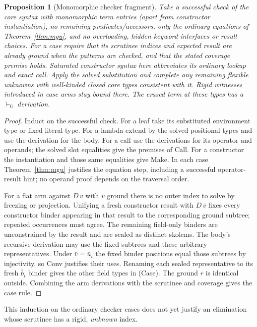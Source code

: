 \documentclass[11pt]{article}
\newtheorem{proposition}[theorem]{Proposition}
\theoremstyle{definition}
\begin{document}
\begin{proposition}[Monomorphic checker fragment]\label{prop:mono}
Take a successful check of the core syntax with monomorphic term entries (apart from
constructor instantiation), no remaining predicates/accessors, only the
ordinary equations of Theorem~\ref{thm:mgu}, and no overloading, hidden
keyword interfaces or result choices. For a case require that its
scrutinee indices and expected result are already ground when the patterns
are checked, and that the stated coverage premise holds. Saturated
constructor syntax here abbreviates its ordinary lookup and exact call.
Apply the solved substitution and complete any remaining flexible unknowns
with well-kinded closed core types consistent with it. Rigid witnesses
introduced in case arms stay bound there. The erased term at these types
has a $\vdash_0$ derivation.
\end{proposition}
\begin{proof}
Induct on the successful check. For a leaf take its substituted environment type or fixed literal
type. For a lambda extend by the solved positional types and use the
derivation for the body. For a call use the derivations for its operator
and operands; the solved slot equalities give the premises of \textsf{Call}.
For a constructor the instantiation and those same equalities give
\textsf{Make}. In each case Theorem~\ref{thm:mgu} justifies the equation
step, including a successful operator-result hint; no operand proof
depends on the traversal order.

For a flat arm against $D\,\bar v$ with $\bar v$ ground there is
no outer index to solve by freezing or projection. Unifying a fresh
constructor result with $D\,\bar v$ fixes every constructor binder
appearing in that result to the corresponding ground subtree; repeated
occurrences must agree. The remaining field-only binders are unconstrained
by the result and are sealed as distinct skolems. The body's recursive
derivation may use the fixed subtrees and these arbitrary representatives.
Under $\bar v=\bar u_i$ the fixed binder positions equal those subtrees
by injectivity, so \textsf{Conv} justifies their uses. Renaming each
sealed representative to its fresh $\bar b_i$ binder gives the other
field types in (Case). The ground $r$ is identical outside. Combining
the arm derivations with the scrutinee and coverage gives the case rule.
\end{proof}
This induction on the ordinary checker cases does not yet justify an
elimination whose scrutinee has a rigid, \emph{unknown} index.
\end{document}
